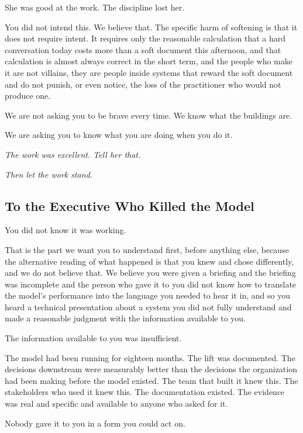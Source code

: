 She was good at the work. The discipline lost her.

You did not intend this. We believe that. The specific harm of softening is that it does not require intent. It requires only the reasonable calculation that a hard conversation today costs more than a soft document this afternoon, and that calculation is almost always correct in the short term, and the people who make it are not villains, they are people inside systems that reward the soft document and do not punish, or even notice, the loss of the practitioner who would not produce one.

We are not asking you to be brave every time. We know what the buildings are.

We are asking you to know what you are doing when you do it.

\textit{The work was excellent. Tell her that.}

\textit{Then let the work stand.}

\subsection*{To the Executive Who Killed the Model}

You did not know it was working.

That is the part we want you to understand first, before anything else, because the alternative reading of what happened is that you knew and chose differently, and we do not believe that. We believe you were given a briefing and the briefing was incomplete and the person who gave it to you did not know how to translate the model's performance into the language you needed to hear it in, and so you heard a technical presentation about a system you did not fully understand and made a reasonable judgment with the information available to you.

The information available to you was insufficient.

The model had been running for eighteen months. The lift was documented. The decisions downstream were measurably better than the decisions the organization had been making before the model existed. The team that built it knew this. The stakeholders who used it knew this. The documentation existed. The evidence was real and specific and available to anyone who asked for it.

Nobody gave it to you in a form you could act on.

